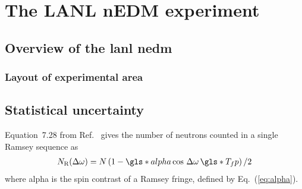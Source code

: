
\chapter{The LANL nEDM experiment}\label{chap:LANL_nEDM}



\section{
    \texorpdfstring{Overview of the \acrshort{lanl} \acrshort{nedm}}
                    {Overview of the LANL nEDM}
}



\subsection{Layout of experimental area}



\section{Statistical uncertainty}\label{sec:figure_of_merit}


Equation~7.28 from Ref.~\cite{golubUCN} gives the number of neutrons counted in a single Ramsey sequence as
%
\begin{gather}
    N_\text{R}(\Delta \omega) = N \left( 1 - \gls*{alpha} \cos \,\Delta \omega \, \gls*{T_fp} \right)/2
\end{gather}
%
where \gls*{alpha} is the spin contrast of a Ramsey fringe, defined by Eq.~(\ref{eq:alpha}). 

